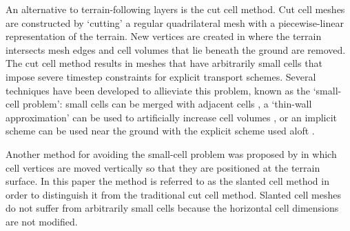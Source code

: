 An alternative to terrain-following layers is the cut cell method.  Cut cell meshes are constructed by `cutting' a regular quadrilateral mesh with a piecewise-linear representation of the terrain.  New vertices are created in where the terrain intersects mesh edges and cell volumes that lie beneath the ground are removed.  The cut cell method results in meshes that have arbitrarily small cells that impose severe timestep constraints for explicit transport schemes.  Several techniques have been developed to allieviate this problem, known as the `small-cell problem': small cells can be merged with adjacent cells \citep{yamazaki2016}, a `thin-wall approximation' can be used to artificially increase cell volumes \citep{steppeler2002}, or an implicit scheme can be used near the ground with the explicit scheme used aloft \citep{jebens2011}.

Another method for avoiding the small-cell problem was proposed by \citep{shaw-weller2016} in which cell vertices are moved vertically so that they are positioned at the terrain surface.  In this paper the method is referred to as the slanted cell method in order to distinguish it from the traditional cut cell method.  Slanted cell meshes do not suffer from arbitrarily small cells because the horizontal cell dimensions are not modified.


%




